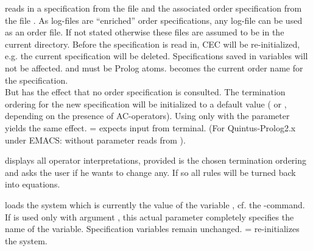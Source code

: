 \begin{command}
reads in a specification from the file 
and the associated order specification from the file
.
As log-files are ``enriched'' order specifications, any log-file can
be used as an order file.
If not stated otherwise these files are assumed to be in the current 
directory. Before the specification is read in, CEC will be re-initialized, 
e.g. the current specification will be deleted. Specifications saved in 
variables will not be affected.  and 
must be Prolog atoms.  becomes the
current order name for the specification.\\
But 
has the effect that no order specification is consulted.
The termination ordering for the new
specification will be initialized to a default value 
( or , depending on the presence of AC-operators).
Using  only with the parameter  yields the same
effect.  =  expects input from terminal.
(For Quintus-Prolog2.x under EMACS:  without
parameter reads from ).
\end{command}


\begin{command}
displays all operator interpretations, provided  is the chosen termination
ordering and asks the user if he wants to change any. If so all rules will be turned 
back into equations.
\end{command}


\begin{command}
loads the system which is currently the value of the variable
, cf. the -command. 
If  is used only with argument , this actual parameter 
completely specifies the name of the variable.
Specification variables remain unchanged.
 =  re-initializes the system.
\end{command}


